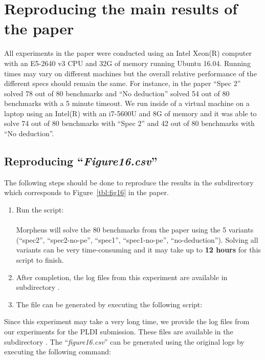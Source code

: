 \section{Reproducing the main results of the paper}
\label{sec:main}

All experiments in the paper were conducted using an Intel Xeon(R) computer with an E5-2640 v3 CPU and 32G of memory running Ubuntu 16.04. Running times may vary on different machines but the overall relative performance of the different specs should remain the same. For instance, in the paper ``Spec 2'' solved 78 out of 80 benchmarks and ``No deduction'' solved 54 out of 80 benchmarks with a 5 minute timeout. We run \toolname inside of a virtual machine on a laptop using an Intel(R) with an i7-5600U and 8G of memory and it was able to solve 74 out of 80 benchmarks with ``Spec 2'' and 42 out of 80 benchmarks with ``No deduction''.

\subsection{Reproducing ``\emph{Figure16.csv}''}

The following steps should be done to reproduce the results in the subdirectory  which corresponds to Figure~\ref{tbl:fig16} in the paper.

\begin{enumerate}
\item Run the script:\\ 
\\
Morpheus will solve the 80 benchmarks from the paper using the 5 variants (``spec2'', ``spec2-no-pe'', ``spec1'', ``spec1-no-pe'', ``no-deduction''). Solving all variants can be very time-consuming and it may take up to \textbf{12 hours} for this script to finish.
\item After completion, the log files from this experiment are available in subdirectory .
\item The  file can be generated by executing the following script:\\ 
\end{enumerate}

Since this experiment may take a very long time, we provide the log files from our experiments for the PLDI submission. These files are available in the subdirectory . The ``\emph{figure16.csv}'' can be generated using the original logs by executing the following command:\\\\

